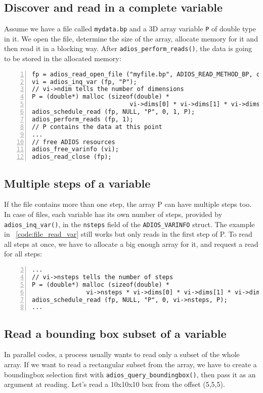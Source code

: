 \subsection{Discover and read in a complete variable}
Assume we have a file called \verb+mydata.bp+ and a 3D array variable \verb+P+ of double type in it. We open the file, determine the size of the array, allocate memory for it and then read it in a blocking way. After \verb+adios_perform_reads()+,  the data is going to be stored in the allocated memory:

\begin{lstlisting}[numbers=left, numberstyle=\color{gray}, stepnumber=2,
                             caption={Read a complete array from a file}, label=code:file_read_var]
fp = adios_read_open_file ("myfile.bp", ADIOS_READ_METHOD_BP, comm);
vi = adios_inq_var (fp, "P");
// vi->ndim tells the number of dimensions
P = (double*) malloc (sizeof(double) * 
                           vi->dims[0] * vi->dims[1] * vi->dims[2]);
adios_schedule_read (fp, NULL, "P", 0, 1, P);
adios_perform_reads (fp, 1);   
// P contains the data at this point
...
// free ADIOS resources
adios_free_varinfo (vi); 
adios_read_close (fp);
\end{lstlisting}


\subsection{Multiple steps of a variable}
 If the file contains more than one step, the array P can have multiple steps too. In case of files, each variable has its own number of steps, provided by \verb+adios_inq_var()+, in the \verb+nsteps+ field of the \verb+ADIOS_VARINFO+ struct. The example in \lstlistingname~\ref{code:file_read_var} still works but only reads in the first step of P. To read all steps at once, we have to allocate a big enough array for it, and request a read for all steps:

\begin{lstlisting}[frame=no, emph={nsteps}, emphstyle={\color{red}\large\bf},
                             numbers=left, numberstyle=\color{gray}, stepnumber=2,firstnumber=3]
...
// vi->nsteps tells the number of steps
P = (double*) malloc (sizeof(double) * 
               vi->nsteps * vi->dims[0] * vi->dims[1] * vi->dims[2]);
adios_schedule_read (fp, NULL, "P", 0, vi->nsteps, P);
...
\end{lstlisting}


\subsection{Read a bounding box subset of a variable}
In parallel codes, a process usually wants to read only a subset of the whole array. If we want to read a rectangular subset from the array, we have to create a boundingbox selection first with \verb+adios_query_boundingbox()+, then pass it as an argument at reading. Let's read a 10x10x10 box from the offset (5,5,5). 


